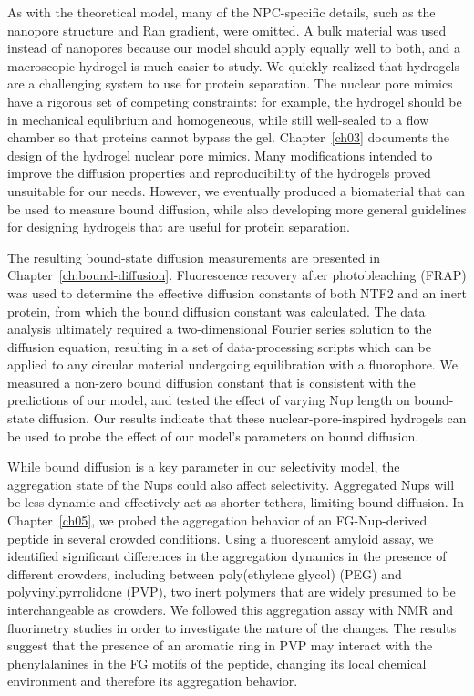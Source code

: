 As with the theoretical model, many of the NPC-specific details, such as the nanopore structure and Ran gradient, were omitted.  A bulk material was used instead of nanopores because our model should apply equally well to both, and a macroscopic hydrogel is much easier to study.  We quickly realized that hydrogels are a challenging system to use for protein separation.  The nuclear pore mimics have a rigorous set of competing constraints: for example, the hydrogel should be in mechanical equlibrium and homogeneous, while still well-sealed to a flow chamber so that proteins cannot bypass the gel.  Chapter~\ref{ch03} documents the design of the hydrogel nuclear pore mimics.  Many modifications intended to improve the diffusion properties and reproducibility of the hydrogels proved unsuitable for our needs.  However, we eventually produced a biomaterial that can be used to measure bound diffusion, while also developing more general guidelines for designing hydrogels that are useful for protein separation.

The resulting bound-state diffusion measurements are presented in Chapter~\ref{ch:bound-diffusion}.  Fluorescence recovery after photobleaching (FRAP) was used to determine the effective diffusion constants of both NTF2 and an inert protein, from which the bound diffusion constant was calculated.  The data analysis ultimately required a two-dimensional Fourier series solution to the diffusion equation, resulting in a set of data-processing scripts which can be applied to any circular material undergoing equilibration with a fluorophore.  We measured a non-zero bound diffusion constant that is consistent with the predictions of our model, and tested the effect of varying Nup length on bound-state diffusion.  Our results indicate that these nuclear-pore-inspired hydrogels can be used to probe the effect of our model's parameters on bound diffusion.

While bound diffusion is a key parameter in our selectivity model, the aggregation state of the Nups could also affect selectivity.  Aggregated Nups will be less dynamic and effectively act as shorter tethers, limiting bound diffusion.  In Chapter~\ref{ch05}, we probed the aggregation behavior of an FG-Nup-derived peptide in several crowded conditions.  Using a fluorescent amyloid assay, we identified significant differences in the aggregation dynamics in the presence of different crowders, including between poly(ethylene glycol) (PEG) and polyvinylpyrrolidone (PVP), two inert polymers that are widely presumed to be interchangeable as crowders.  We followed this aggregation assay with NMR and fluorimetry studies in order to investigate the nature of the changes.  The results suggest that the presence of an aromatic ring in PVP may interact with the phenylalanines in the FG motifs of the peptide, changing its local chemical environment and therefore its aggregation behavior.

